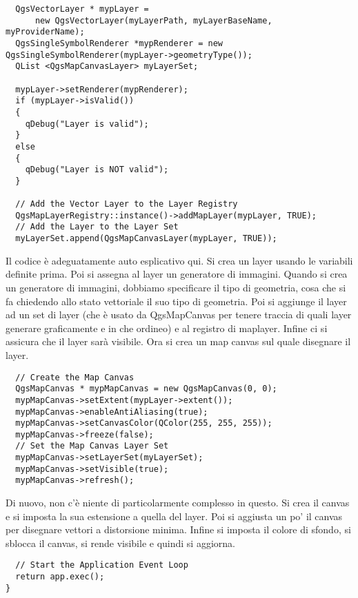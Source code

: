 \begin{verbatim}
  QgsVectorLayer * mypLayer =
      new QgsVectorLayer(myLayerPath, myLayerBaseName, myProviderName);
  QgsSingleSymbolRenderer *mypRenderer = new
QgsSingleSymbolRenderer(mypLayer->geometryType());
  QList <QgsMapCanvasLayer> myLayerSet;

  mypLayer->setRenderer(mypRenderer);
  if (mypLayer->isValid())
  {
    qDebug("Layer is valid");
  }
  else
  {
    qDebug("Layer is NOT valid");
  }

  // Add the Vector Layer to the Layer Registry
  QgsMapLayerRegistry::instance()->addMapLayer(mypLayer, TRUE);
  // Add the Layer to the Layer Set
  myLayerSet.append(QgsMapCanvasLayer(mypLayer, TRUE));

\end{verbatim}

Il codice è adeguatamente auto esplicativo qui. Si crea un layer usando le variabili definite prima. Poi si assegna al layer un generatore di immagini. Quando si crea un generatore di immagini, dobbiamo specificare il tipo di geometria, cosa che si fa chiedendo allo stato vettoriale il suo tipo di geometria. Poi si aggiunge il layer ad un set di layer (che è usato da QgsMapCanvas per tenere traccia di quali layer generare graficamente e in che ordineo) e al registro di maplayer. Infine ci si assicura che il layer sarà visibile.
Ora si crea un map canvas sul quale disegnare il layer.

\begin{verbatim}
  // Create the Map Canvas
  QgsMapCanvas * mypMapCanvas = new QgsMapCanvas(0, 0);
  mypMapCanvas->setExtent(mypLayer->extent());
  mypMapCanvas->enableAntiAliasing(true);
  mypMapCanvas->setCanvasColor(QColor(255, 255, 255));
  mypMapCanvas->freeze(false);
  // Set the Map Canvas Layer Set
  mypMapCanvas->setLayerSet(myLayerSet);
  mypMapCanvas->setVisible(true);
  mypMapCanvas->refresh();

\end{verbatim}

Di nuovo, non c'è niente di particolarmente complesso in questo. Si crea il canvas e si imposta la sua estensione a quella del layer. Poi si aggiusta un po' il canvas per disegnare vettori a distorsione minima. Infine si imposta il colore di sfondo, si sblocca il canvas, si rende visibile e quindi si aggiorna.

\begin{verbatim}
  // Start the Application Event Loop
  return app.exec();
}

\end{verbatim}

